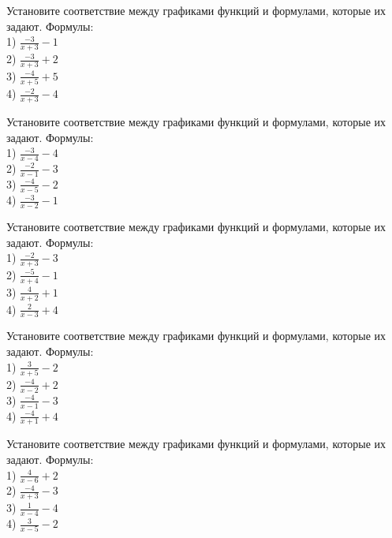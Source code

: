 \documentclass[4apaper]{article}
\begin{document}
\begin{taskBN}{61}
Установите соответствие между графиками функций и формулами, которые их задают. Формулы: \\1) $\frac{-3}{x+3}-1$\\2) $\frac{-3}{x+3}+2$\\3) $\frac{-4}{x+5}+5$\\4) $\frac{-2}{x+3}-4$
\end{taskBN}

\begin{taskBN}{62}
Установите соответствие между графиками функций и формулами, которые их задают. Формулы: \\1) $\frac{-3}{x-4}-4$\\2) $\frac{-2}{x-1}-3$\\3) $\frac{-4}{x-5}-2$\\4) $\frac{-3}{x-2}-1$
\end{taskBN}

\begin{taskBN}{63}
Установите соответствие между графиками функций и формулами, которые их задают. Формулы: \\1) $\frac{-2}{x+3}-3$\\2) $\frac{-5}{x+4}-1$\\3) $\frac{4}{x+2}+1$\\4) $\frac{2}{x-3}+4$
\end{taskBN}

\begin{taskBN}{64}
Установите соответствие между графиками функций и формулами, которые их задают. Формулы: \\1) $\frac{3}{x+5}-2$\\2) $\frac{-4}{x-2}+2$\\3) $\frac{-4}{x-1}-3$\\4) $\frac{-4}{x+1}+4$
\end{taskBN}

\begin{taskBN}{65}
Установите соответствие между графиками функций и формулами, которые их задают. Формулы: \\1) $\frac{4}{x-6}+2$\\2) $\frac{-4}{x+3}-3$\\3) $\frac{1}{x-4}-4$\\4) $\frac{3}{x-5}-2$
\end{taskBN}
\end{document}
